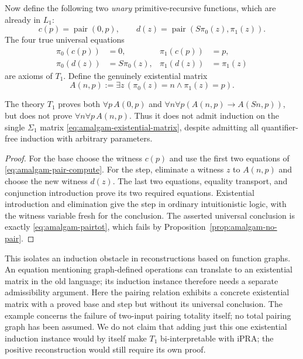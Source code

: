 Now define the following two \emph{unary} primitive-recursive
functions, which are already in $L_1$:
\[
 c(p)=\operatorname{pair}(0,p),\qquad
 d(z)=\operatorname{pair}(S\pi_0(z),\pi_1(z)).
\]
The four true universal equations
\[
 \begin{aligned}
 \pi_0(c(p))&=0,&\pi_1(c(p))&=p,\\
 \pi_0(d(z))&=S\pi_0(z),&\pi_1(d(z))&=\pi_1(z)
 \end{aligned}
 \tag{PC}\label{eq:amalgam-pair-compute}
\]
are axioms of $T_1$. Define the genuinely existential matrix
\[
 A(n,p):=\exists z\,
             (\pi_0(z)=n\wedge\pi_1(z)=p).
 \tag{A}\label{eq:amalgam-existential-matrix}
\]

\begin{corollary}
\label{cor:amalgam-induction-gap}
The theory $T_1$ proves both $\forall p\,A(0,p)$ and
$\forall n\forall p(A(n,p)\to A(Sn,p))$, but does not prove
$\forall n\forall p\,A(n,p)$. Thus it does not admit induction
on the single $\Sigma_1$ matrix
\eqref{eq:amalgam-existential-matrix}, despite admitting all
quantifier-free induction with arbitrary parameters.
\end{corollary}
\begin{proof}
For the base choose the witness $c(p)$ and use the first two
equations of \eqref{eq:amalgam-pair-compute}. For the step,
eliminate a witness $z$ to $A(n,p)$ and choose the new witness
$d(z)$. The last two equations, equality transport, and conjunction
introduction prove its two required equations. Existential
introduction and elimination give the step in ordinary intuitionistic
logic, with the witness variable fresh for the conclusion.
The asserted universal conclusion is exactly
\eqref{eq:amalgam-pairtot}, which fails by
Proposition~\ref{prop:amalgam-no-pair}.
\end{proof}

This isolates an induction obstacle in reconstructions based on
function graphs. An equation mentioning graph-defined operations
can translate to an existential matrix in the old language; its
induction instance therefore needs a separate admissibility argument.
Here the pairing relation exhibits a concrete existential matrix with
a proved base and step but without its universal conclusion. The
example concerns the failure of two-input pairing totality itself;
no total pairing graph has been assumed. We do not claim that adding
just this one existential
induction instance would by itself make $T_1$ bi-interpretable with
iPRA; the positive reconstruction would still require its own proof.

